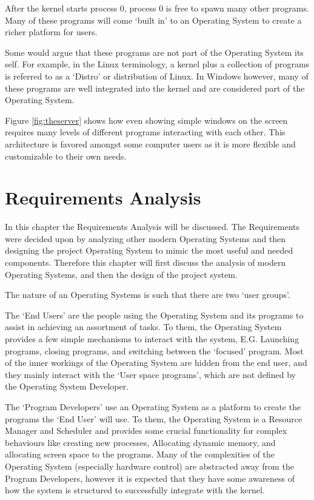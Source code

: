 \documentclass[a4paper]{report}
\begin{document}
After the kernel starts process 0, process 0 is free to spawn many other programs. Many of these programs will come `built in' to an Operating System to create a richer platform for users.

Some would argue that these programs are not part of the Operating System its self. For example, in the Linux terminology, a kernel plus a collection of programs is referred to as a `Distro' or distribution of Linux. In Windows however, many of these programs are well integrated into the kernel and are considered part of the Operating System.

Figure \ref{fig:theserver} shows how even showing simple windows on the screen requires many levels of different programs interacting with each other. This architecture is favored amongst some computer users as it is more flexible and customizable to their own needs.

\chapter*{Requirements Analysis}

In this chapter the Requirements Analysis will be discussed. The Requirements were decided upon by analyzing other modern Operating Systems and then designing the project Operating System to mimic the most useful and needed components. Therefore this chapter will first discuss the analysis of modern Operating Systems, and then the design of the project system.


The nature of an Operating Systems is such that there are two `user groups'.


The `End Users' are the people using the Operating System and its programs to assist in achieving an assortment of tasks. To them, the Operating System provides a few simple mechanisms to interact with the system, E.G. Launching programs, closing programs, and switching between the `focused' program. Most of the inner workings of the Operating System are hidden from the end user, and they mainly interact with the `User space programs', which are not defined by the Operating System Developer.


The `Program Developers' use an Operating System as a platform to create the programs the `End User' will use. To them, the Operating System is a Resource Manager and Scheduler and provides some crucial functionality for complex behaviours like creating new processes, Allocating dynamic memory, and allocating screen space to the programs. Many of the complexities of the Operating System (especially hardware control) are abstracted away from the Program Developers, however it is expected that they have some awareness of how the system is structured to successfully integrate with the kernel.
\end{document}
